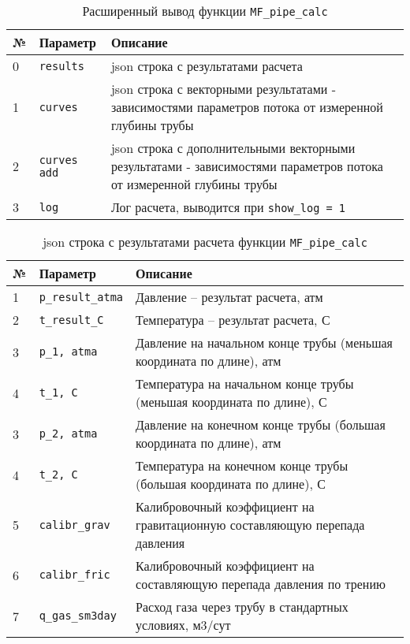 \begin{table}[H]
	\caption{Расширенный вывод функции \texttt{MF_pipe_calc} }
	\label{table:param_list_MF_pipe_calc}
	\begin{tabular}{p{}p{}p{}}
		\hline
		№& Параметр & Описание  \\ \hline
		0 & \texttt{results} & json строка с результатами расчета  \\ \hline
		
		1 & \texttt{curves} & json строка с векторными результатами - зависимостями параметров потока от измеренной глубины трубы\\ \hline
		2 & \texttt{curves add} & json строка с дополнительными векторными результатами - зависимостями параметров потока от измеренной глубины трубы\\ \hline
		3 & \texttt{log} & Лог расчета, выводится при \texttt{show_log = 1}  \\ \hline
		
	\end{tabular}
\end{table}

\begin{table}[H]
	\caption{json строка с результатами расчета функции \texttt{MF_pipe_calc} }
	\label{table:res_list_MF_pipe_calc}
	\begin{tabular}{p{}p{}p{}}
		\hline
		№& Параметр & Описание  \\ \hline
		
		1 & \texttt{p_result_atma} & Давление -- результат расчета, атм    \\ \hline
		2 & \texttt{t_result_C} & Температура -- результат расчета, С    \\ \hline
		3 & \texttt{p_1, atma} & Давление на начальном конце трубы (меньшая координата по длине), атм  \\ \hline
		4 & \texttt{t_1, C} & Температура на начальном конце трубы (меньшая координата по длине), С      \\ \hline
		3 & \texttt{p_2, atma} & Давление на конечном конце трубы (большая координата по длине), атм     \\ \hline
		4 & \texttt{t_2, C} & Температура на конечном конце трубы (большая координата по длине), С     \\ \hline
		5 & \texttt{calibr_grav} & Калибровочный коэффициент на гравитационную составляющую перепада давления   \\ \hline
		6 & \texttt{calibr_fric} &  Калибровочный коэффициент на составляющую перепада давления по трению  \\ \hline
		
		7 & \texttt{q_gas_sm3day} &  Расход газа через трубу в стандартных условиях, м3/сут \\ \hline
		
	\end{tabular}
\end{table}

